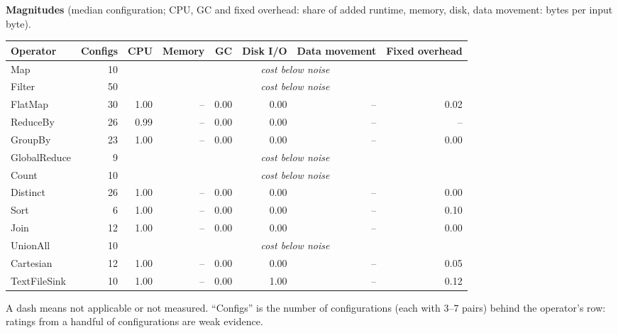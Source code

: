\documentclass[11pt,a4paper]{article}
\begin{document}
\textbf{Magnitudes} (median configuration; CPU, GC and fixed overhead: share of added runtime, memory, disk, data movement: bytes per input byte).
\begin{center}\footnotesize\begin{tabular}{lrrrrrrr}\toprule

Operator & Configs & CPU & Memory & GC & Disk I/O & Data movement & Fixed overhead\\\midrule

Map & 10 & \multicolumn{6}{c}{\emph{cost below noise}}\\

Filter & 50 & \multicolumn{6}{c}{\emph{cost below noise}}\\

FlatMap & 30 & 1.00 & -- & 0.00 & 0.00 & -- & 0.02\\

ReduceBy & 26 & 0.99 & -- & 0.00 & 0.00 & -- & --\\

GroupBy & 23 & 1.00 & -- & 0.00 & 0.00 & -- & 0.00\\

GlobalReduce & 9 & \multicolumn{6}{c}{\emph{cost below noise}}\\

Count & 10 & \multicolumn{6}{c}{\emph{cost below noise}}\\

Distinct & 26 & 1.00 & -- & 0.00 & 0.00 & -- & 0.00\\

Sort & 6 & 1.00 & -- & 0.00 & 0.00 & -- & 0.10\\

Join & 12 & 1.00 & -- & 0.00 & 0.00 & -- & 0.00\\

UnionAll & 10 & \multicolumn{6}{c}{\emph{cost below noise}}\\

Cartesian & 12 & 1.00 & -- & 0.00 & 0.00 & -- & 0.05\\

TextFileSink & 10 & 1.00 & -- & 0.00 & 1.00 & -- & 0.12\\
\bottomrule\end{tabular}\end{center}

A dash means not applicable or not measured. ``Configs'' is the number of configurations (each with 3--7 pairs) behind the operator's row: ratings from a handful of configurations are weak evidence.
\end{document}
